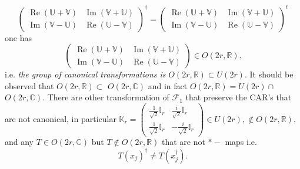 \documentclass[aps, preprint]{revtex4}
\begin{document}
\begin{equation}\left (\begin{array}{cc}\ensuremath{\operatorname*{Re}} \left (\mathbb{U} +\mathbb{V}\right ) & \ensuremath{\operatorname*{Im}} \left (\mathbb{V} +\mathbb{U}\right ) \\
\ensuremath{\operatorname*{Im}} \left (\mathbb{V} -\mathbb{U}\right ) & \ensuremath{\operatorname*{Re}} \left (\mathbb{U} -\mathbb{V}\right )\end{array}\right )^{ \dag } =\left (\begin{array}{cc}\ensuremath{\operatorname*{Re}} \left (\mathbb{U} +\mathbb{V}\right ) & \ensuremath{\operatorname*{Im}} \left (\mathbb{V} +\mathbb{U}\right ) \\
\ensuremath{\operatorname*{Im}} \left (\mathbb{V} -\mathbb{U}\right ) & \ensuremath{\operatorname*{Re}} \left (\mathbb{U} -\mathbb{V}\right )\end{array}\right )^{t}
\end{equation}one has
\begin{equation}\left (\begin{array}{cc}\ensuremath{\operatorname*{Re}} \left (\mathbb{U} +\mathbb{V}\right ) & \ensuremath{\operatorname*{Im}} \left (\mathbb{V} +\mathbb{U}\right ) \\
\ensuremath{\operatorname*{Im}} \left (\mathbb{V} -\mathbb{U}\right ) & \ensuremath{\operatorname*{Re}} \left (\mathbb{U} -\mathbb{V}\right )\end{array}\right ) \in O \left (2 r ,\mathbb{R}\right )\text{,}
\end{equation}i.e. \emph{the group of canonical transformations is }$O \left (2 r ,\mathbb{R}\right ) \subset U \left (2 r\right )\text{.}$ It should be observed that $O \left (2 r ,\mathbb{R}\right ) \subset $ $O \left (2 r ,\mathbb{C}\right )$ and in fact $O \left (2 r ,\mathbb{R}\right ) =U \left (2 r\right ) \cap $ $O \left (2 r ,\mathbb{C}\right )\text{.}$ There are other transformation of $\mathcal{F}_{1}$ that preserve the CAR's that are not canonical, in particular $\mathbb{K}_{r} =\left (\begin{array}{cc}\frac{1}{\sqrt{2}} \mathbb{I}_{r} & \frac{i}{\sqrt{2}} \mathbb{I}_{r} \\
\frac{1}{\sqrt{2}} \mathbb{I}_{r} &  -\frac{i}{\sqrt{2}} \mathbb{I}_{r}\end{array}\right ) \in U \left (2 r\right ) , \notin O \left (2 r ,\mathbb{R}\right )\text{,}$ and any $T \in O \left (2 r ,\mathbb{C}\right )$ but $T \notin O \left (2 r ,\mathbb{R}\right )$ that are not $ \ast  -$ maps i.e.
\begin{equation}T \left (x_{j}\right )^{ \dag } \neq T \left (x_{j}^{ \dag }\right )\text{.}
\end{equation}
\end{document}
